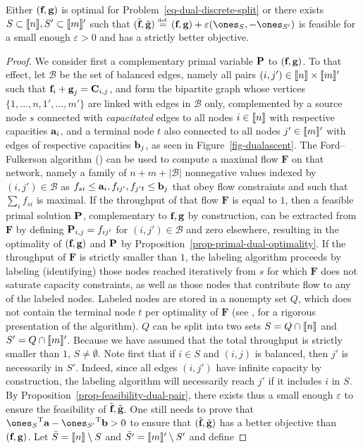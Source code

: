 \begin{prop}\label{prop-dual-ascent-dir} Either $(\fD,\gD)$ is optimal for Problem~\eqref{eq-dual-discrete-split} or there exists $S\subset\range{n},S'\subset\range{m}'$ such that $(\tilde{\fD},\tilde{\gD})\eqdef(\fD,\gD)+\varepsilon(\ones_S,-\ones_{S'})$ is feasible for a small enough $\varepsilon>0$ and has a strictly better objective.
\end{prop}
\begin{proof}
We consider first a complementary primal variable $\P$ to $(\fD,\gD)$. To that effect, let $\mathcal{B}$ be the set of balanced edges, namely all pairs $(i,j')\in\range{n}\times\range{m}'$ such that $\fD_i+\gD_j=\C_{i,j}$, and form the bipartite graph whose vertices $\{1,\dots,n,1',\dots,m'\}$ are linked with edges in $\mathcal{B}$ only, complemented by a source node $s$ connected with \emph{capacitated} edges to all nodes $i\in\range{n}$ with respective capacities $\a_i$, and a terminal node $t$ also connected to all nodes $j'\in\range{m}'$ with edges of respective capacities $\b_j$, as seen in Figure~\ref{fig-dualascent}. The Ford--Fulkerson algorithm (\cite[p. 305]{bertsimas1997introduction}) can be used to compute a maximal flow $\mathbf{F}$ on that network, namely a family of $n+m+|\mathcal{B}|$ nonnegative values indexed by $(i,j')\in \mathcal{B}$ as $f_{si}\leq \a_i, f_{ij'}, f_{j't}\leq\b_j$ that obey flow constraints and such that $\sum_i f_{si}$ is maximal. If the throughput of that flow $\mathbf{F}$ is equal to $1$, then a feasible primal solution $\P$, complementary to $\fD,\gD$ by construction, can be extracted from $\mathbf{F}$ by defining $\P_{i,j}=f_{ij'}$ for $(i,j')\in \mathcal{B}$ and zero elsewhere, resulting in the optimality of $(\fD,\gD)$ and $\P$ by Proposition~\ref{prop-primal-dual-optimality}. If the throughput of $\mathbf{F}$ is strictly smaller than $1$, the labeling algorithm proceeds by labeling (identifying) those nodes reached iteratively from $s$ for which $\mathbf{F}$ does not saturate capacity constraints, as well as those nodes that contribute flow to any of the labeled nodes. Labeled nodes are stored in a nonempty set $Q$, which does not contain the terminal node $t$ per optimality of $\mathbf{F}$ (see \citealt[p. 308]{bertsimas1997introduction}, for a rigorous presentation of the algorithm). $Q$ can be split into two sets $S=Q\cap\range{n}$ and $S'=Q\cap\range{m}'$. Because we have assumed that the total throughput is strictly smaller than $1$, $S\ne\emptyset$. Note first that if $i\in S$ and $(i,j)$ is balanced, then $j'$ is necessarily in $S'$. Indeed, since all edges $(i,j')$ have infinite capacity by construction, the labeling algorithm will necessarily reach $j'$ if it includes $i$ in $S$. By Proposition~\ref{prop-feasibility-dual-pair}, there exists thus a small enough $\varepsilon$ to ensure the feasibility of $\tilde{\fD},\tilde{\gD}$. One still needs to prove that $\transp{\ones_S}{\a}-\transp{\ones_{S'}}{\b}>0$ to ensure that $(\tilde{\fD},\tilde{\gD})$ has a better objective than $(\fD,\gD)$. Let $\bar{S}=\range{n}\setminus S$ and $\bar{S'}=\range{m}'\setminus S'$ and define

\end{proof}
